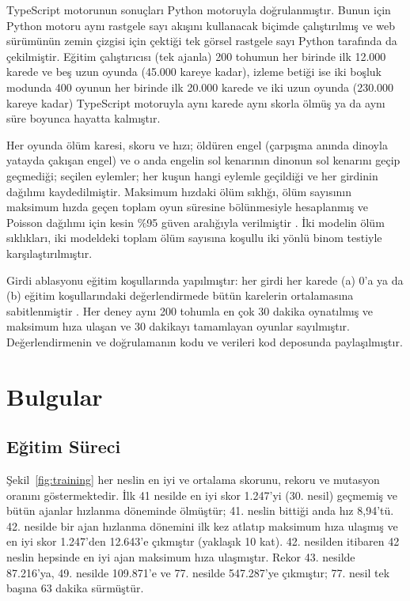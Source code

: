 \documentclass[11pt,a4paper]{article}
\begin{document}
TypeScript motorunun sonuçları Python motoruyla doğrulanmıştır. Bunun için Python motoru aynı rastgele sayı akışını kullanacak biçimde çalıştırılmış ve web sürümünün zemin çizgisi için çektiği tek görsel rastgele sayı Python tarafında da çekilmiştir. Eğitim çalıştırıcısı (tek ajanla) 200 tohumun her birinde ilk 12.000 karede ve beş uzun oyunda (45.000 kareye kadar), izleme betiği ise iki boşluk modunda 400 oyunun her birinde ilk 20.000 karede ve iki uzun oyunda (230.000 kareye kadar) TypeScript motoruyla aynı karede aynı skorla ölmüş ya da aynı süre boyunca hayatta kalmıştır.

Her oyunda ölüm karesi, skoru ve hızı; öldüren engel (çarpışma anında dinoyla yatayda çakışan engel) ve o anda engelin sol kenarının dinonun sol kenarını geçip geçmediği; seçilen eylemler; her kuşun hangi eylemle geçildiği ve her girdinin dağılımı kaydedilmiştir. Maksimum hızdaki ölüm sıklığı, ölüm sayısının maksimum hızda geçen toplam oyun süresine bölünmesiyle hesaplanmış ve Poisson dağılımı için kesin \%95 güven aralığıyla verilmiştir \cite{garwood1936}. İki modelin ölüm sıklıkları, iki modeldeki toplam ölüm sayısına koşullu iki yönlü binom testiyle karşılaştırılmıştır.

Girdi ablasyonu eğitim koşullarında yapılmıştır: her girdi her karede (a) 0'a ya da (b) eğitim koşullarındaki değerlendirmede bütün karelerin ortalamasına sabitlenmiştir \cite{covert2021}. Her deney aynı 200 tohumla en çok 30 dakika oynatılmış ve maksimum hıza ulaşan ve 30 dakikayı tamamlayan oyunlar sayılmıştır. Değerlendirmenin ve doğrulamanın kodu ve verileri kod deposunda paylaşılmıştır.

\section{Bulgular}

\subsection{Eğitim Süreci}

Şekil~\ref{fig:training} her neslin en iyi ve ortalama skorunu, rekoru ve mutasyon oranını göstermektedir. İlk 41 nesilde en iyi skor 1.247'yi (30. nesil) geçmemiş ve bütün ajanlar hızlanma döneminde ölmüştür; 41. neslin bittiği anda hız 8,94'tü. 42. nesilde bir ajan hızlanma dönemini ilk kez atlatıp maksimum hıza ulaşmış ve en iyi skor 1.247'den 12.643'e çıkmıştır (yaklaşık 10 kat). 42. nesilden itibaren 42 neslin hepsinde en iyi ajan maksimum hıza ulaşmıştır. Rekor 43. nesilde 87.216'ya, 49. nesilde 109.871'e ve 77. nesilde 547.287'ye çıkmıştır; 77. nesil tek başına 63 dakika sürmüştür.
\end{document}
